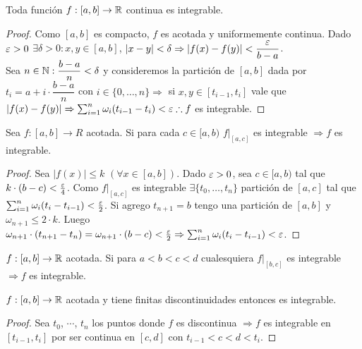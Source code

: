 \clearpage

\begin{theorem}
  Toda función \(f : [a, b] \to \mathbb{R} \) continua es integrable.
  \begin{proof}
    Como \([a, b]\) es compacto, \(f\) es acotada y uniformemente continua. Dado \(\varepsilon > 0\) \(\exists \delta > 0 : x, y \in [a, b]\), \(|x-y| < \delta \Rightarrow |f(x) - f(y)| < \dfrac{\varepsilon}{b-a} \). \\
    Sea \(n \in \mathbb{N} : \dfrac{b-a}{n} < \delta \) y consideremos la partición de \([a, b]\) dada por \(t_i = a + i \cdot \dfrac{b-a}{n} \) con \(i \in \{0, \ldots, n\} \Rightarrow \) si \(x, y \in [t_{i-1}, t_i]\) vale que \(|f(x) - f(y)| \Rightarrow \sum_{i=1}^n \omega_i (t_{i-1} - t_i) < \varepsilon \therefore f\) es integrable.
  \end{proof}
\end{theorem}

\begin{theorem}
  Sea \(f: [a, b] \to R\) acotada. Si para cada \(c \in [a, b)\) \(f|_{[a, c]} \) es integrable \(\Rightarrow f\) es integrable.
  \begin{proof}
    Sea \(|f(x)| \leq k\) \((\forall x \in [a,b])\). Dado \(\varepsilon > 0\), sea \(c \in [a, b)\) tal que \(k \cdot (b-c) < \frac{\varepsilon}{4} \). Como \( f|_{[a, c]} \) es integrable \(\exists \{t_0, \ldots, t_n\} \) partición de \([a, c]\) tal que \(\sum_{i = 1}^n \omega_i (t_i - t_{i-1}) < \frac{\varepsilon}{2} \). Si agrego \(t_{n+1} = b\) tengo una partición de \([a, b]\) y \(\omega_{n+1} \leq 2 \cdot k\). Luego \(\omega_{n+1} \cdot (t_{n+1} - t_n) = \omega_{n+1} \cdot (b-c) < \frac{\varepsilon}{2} \Rightarrow \sum_{i = 1}^n \omega_i (t_i - t_{i-1}) < \varepsilon \).
  \end{proof}
\end{theorem}

\begin{corollary}
  \(f: [a, b] \to \mathbb{R} \) acotada. Si para \(a < b < c < d\) cualesquiera \(f|_{[b, c]} \) es integrable \(\Rightarrow f\) es integrable.
\end{corollary}

\begin{corollary}
  \(f: [a, b] \to \mathbb{R} \) acotada y tiene finitas discontinuidades entonces es integrable.
  \begin{proof}
    Sea \(t_0\), \(\cdots \), \(t_n\) los puntos donde \(f\) es discontinua \(\Rightarrow f\) es integrable en \([t_{i-1}, t_i]\) por ser continua en \([c, d]\) con \(t_{i-1} < c < d < t_i\).
  \end{proof}
\end{corollary}

